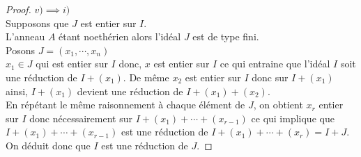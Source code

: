 \begin{proof}
	$v) \implies i)$\\
	Supposons que $J$ est entier sur $I$.\\
	L'anneau $A$ étant noethérien alors l'idéal $J$ est de type fini.\\ Posons $J = (x_1, \cdots ,x_n)$\\
	$x_1 \in J$ qui est entier sur $I$ donc, $x$ est entier sur $I$ ce qui entraine que l'idéal $I$ soit une réduction de $I + (x_1)$. De même $x_2$ est entier sur $I$ donc sur $I + (x_1)$ ainsi, $I + (x_1)$ devient une réduction de $I + (x_1) + (x_2)$.\\ En répétant le même raisonnement à chaque élément de $J$, on obtient $x_r$ entier sur $I$ donc nécessairement sur $I + (x_1) + \cdots +(x_{r-1})$ ce qui implique que $I + (x_1) + \cdots +(x_{r-1})$ est une réduction de $I + (x_1) + \cdots +(x_{r}) = I+J$.\\
	On déduit donc que $I$ est une réduction de $J$. 
\end{proof}

